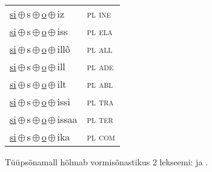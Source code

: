 \begin{minipage}{\textwidth}
\begin{sideways}
\begin{tabular}{l l}
\underline{si}\,$\oplus$\,s\,$\oplus$\,\underline{o}\,$\oplus$\,iz & \textsc{ pl ine } \\
\underline{si}\,$\oplus$\,s\,$\oplus$\,\underline{o}\,$\oplus$\,iss & \textsc{ pl ela } \\
\underline{si}\,$\oplus$\,s\,$\oplus$\,\underline{o}\,$\oplus$\,illõ & \textsc{ pl all } \\
\underline{si}\,$\oplus$\,s\,$\oplus$\,\underline{o}\,$\oplus$\,ill & \textsc{ pl ade } \\
\underline{si}\,$\oplus$\,s\,$\oplus$\,\underline{o}\,$\oplus$\,ilt & \textsc{ pl abl } \\
\underline{si}\,$\oplus$\,s\,$\oplus$\,\underline{o}\,$\oplus$\,issi & \textsc{ pl tra } \\
\underline{si}\,$\oplus$\,s\,$\oplus$\,\underline{o}\,$\oplus$\,issaa & \textsc{ pl ter } \\
\underline{si}\,$\oplus$\,s\,$\oplus$\,\underline{o}\,$\oplus$\,ika & \textsc{ pl com } \\
\end{tabular}
\end{sideways}
\label{tab:tüüpsõnamall-siso}

\end{minipage}

 
\vspace{1em}
\noindent Tüüpsõnamall  hõlmab vormisõnastikus 2 lekseemi:  ja .
